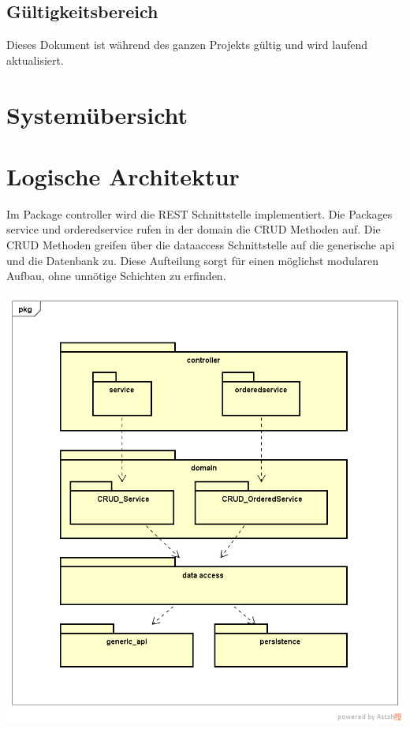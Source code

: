 \documentclass[11pt]{scrartcl}
\begin{document}
\subsection{Gültigkeitsbereich}
Dieses Dokument ist während des ganzen Projekts gültig und wird laufend aktualisiert.

\newpage

\section{Systemübersicht}

\section{Logische Architektur}
Im Package controller wird die REST Schnittstelle implementiert. Die Packages service und orderedservice rufen in der domain die CRUD Methoden auf. Die CRUD Methoden greifen über die dataaccess Schnittstelle auf die generische api und die Datenbank zu. Diese Aufteilung sorgt für einen möglichst modularen Aufbau, ohne unnötige Schichten zu erfinden.

\begin{center}
\includegraphics[scale=0.5]{LogischeSicht}
\end{center}
\end{document}
